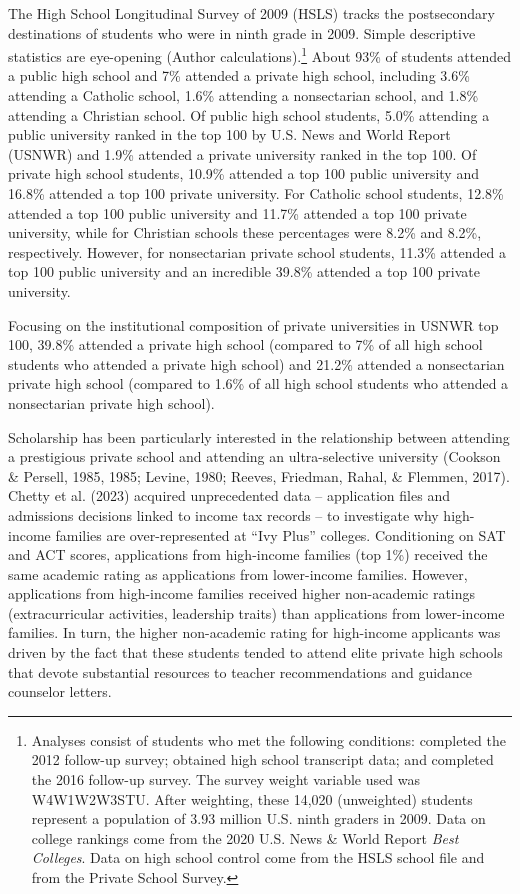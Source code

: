 \documentclass[
  12pt,
]{article}
\begin{document}
The High School Longitudinal Survey of 2009 (HSLS) tracks the postsecondary destinations of students who were in ninth grade in 2009. Simple descriptive statistics are eye-opening (Author calculations).\footnote{Analyses consist of students who met the following conditions: completed the 2012 follow-up survey; obtained high school transcript data; and completed the 2016 follow-up survey. The survey weight variable used was W4W1W2W3STU. After weighting, these 14,020 (unweighted) students represent a population of 3.93 million U.S. ninth graders in 2009. Data on college rankings come from the 2020 U.S. News \& World Report \emph{Best Colleges}. Data on high school control come from the HSLS school file and from the Private School Survey.} About 93\% of students attended a public high school and 7\% attended a private high school, including 3.6\% attending a Catholic school, 1.6\% attending a nonsectarian school, and 1.8\% attending a Christian school. Of public high school students, 5.0\% attending a public university ranked in the top 100 by U.S. News and World Report (USNWR) and 1.9\% attended a private university ranked in the top 100. Of private high school students, 10.9\% attended a top 100 public university and 16.8\% attended a top 100 private university. For Catholic school students, 12.8\% attended a top 100 public university and 11.7\% attended a top 100 private university, while for Christian schools these percentages were 8.2\% and 8.2\%, respectively. However, for nonsectarian private school students, 11.3\% attended a top 100 public university and an incredible 39.8\% attended a top 100 private university.

Focusing on the institutional composition of private universities in USNWR top 100, 39.8\% attended a private high school (compared to 7\% of all high school students who attended a private high school) and 21.2\% attended a nonsectarian private high school (compared to 1.6\% of all high school students who attended a nonsectarian private high school).

Scholarship has been particularly interested in the relationship between attending a prestigious private school and attending an ultra-selective university (Cookson \& Persell, 1985, 1985; Levine, 1980; Reeves, Friedman, Rahal, \& Flemmen, 2017). Chetty et al. (2023) acquired unprecedented data -- application files and admissions decisions linked to income tax records -- to investigate why high-income families are over-represented at ``Ivy Plus'' colleges. Conditioning on SAT and ACT scores, applications from high-income families (top 1\%) received the same academic rating as applications from lower-income families. However, applications from high-income families received higher non-academic ratings (extracurricular activities, leadership traits) than applications from lower-income families. In turn, the higher non-academic rating for high-income applicants was driven by the fact that these students tended to attend elite private high schools that devote substantial resources to teacher recommendations and guidance counselor letters.
\end{document}
